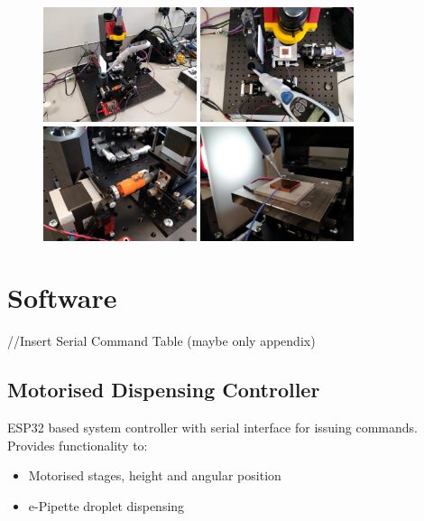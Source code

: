 \begin{figure}[h]
    \centering
    \includegraphics[width=0.4\textwidth]{img/full_sys.jpg}
    \includegraphics[width=0.4\textwidth]{img/impl_sys_top.jpg}
    \includegraphics[width=0.4\textwidth]{img/impl_coup.jpg}
    \includegraphics[width=0.4\textwidth]{img/new_stack.jpg}
\end{figure}

\section{Software}

//Insert Serial Command Table (maybe only appendix)

\subsection{Motorised Dispensing Controller}
ESP32 based system controller with serial interface for issuing commands. Provides functionality to:
\begin{itemize}
    \item Motorised stages, height and angular position
    \item e-Pipette droplet dispensing
\end{itemize}

